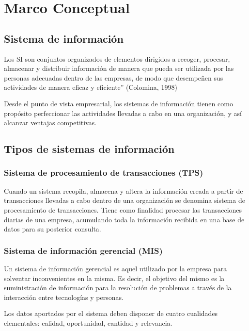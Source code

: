 \chapter{Marco Conceptual}

\section{Sistema de información} 	
\setlength{\parskip}{5mm}
Los SI son conjuntos organizados de elementos dirigidos a recoger, procesar, almacenar y distribuir información de manera que pueda ser utilizada por las personas adecuadas dentro de las empresas, de modo que desempeñen sus actividades de manera eficaz y eficiente” (Colomina, 1998)

Desde el punto de vista empresarial, los sistemas de información tienen como propósito perfeccionar las actividades llevadas a cabo en una organización, y así alcanzar ventajas competitivas.

\setlength{\parskip}{0mm}


\section{Tipos de sistemas de información} 	

\subsection{Sistema de procesamiento de transacciones (TPS)}
\setlength{\parskip}{5mm}
Cuando un sistema recopila, almacena y altera la información creada a partir de transacciones llevadas a cabo dentro de una organización se denomina sistema de procesamiento de transacciones. Tiene como finalidad procesar las transacciones diarias de una empresa, acumulando toda la información recibida en una base de datos para su posterior consulta.

\setlength{\parskip}{0mm}

\subsection{Sistema de información gerencial (MIS)}
\setlength{\parskip}{5mm}
Un sistema de información gerencial es aquel utilizado por la empresa para solventar inconvenientes en la misma. Es decir, el objetivo del mismo es la suministración de información para la resolución de problemas a través de la interacción entre tecnologías y personas.

Los datos aportados por el sistema deben disponer de cuatro cualidades elementales: calidad, oportunidad, cantidad y relevancia.

